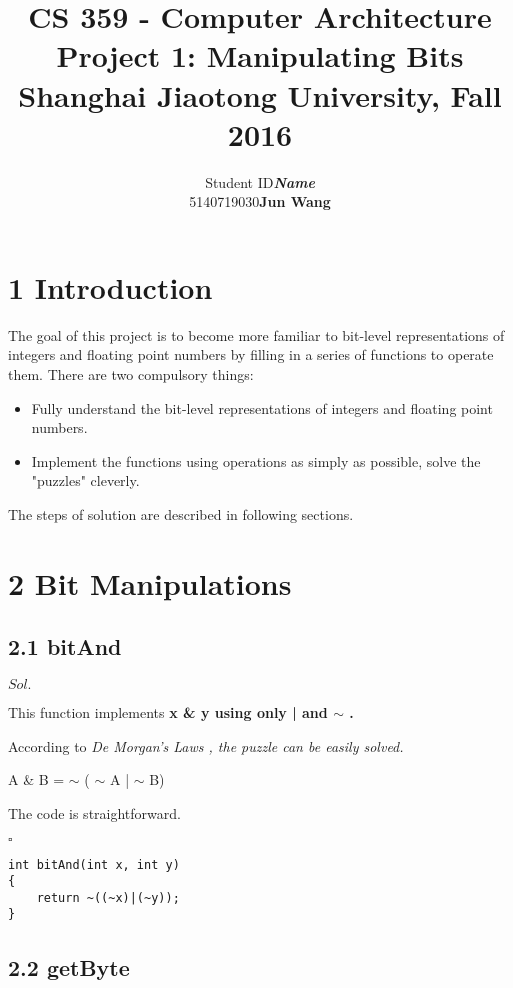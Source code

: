 \documentclass[a4paper, 11pt]{article}
\title{CS 359 - Computer Architecture \\ Project 1: Manipulating Bits \\ \vspace{3mm} {\large Shanghai Jiaotong University, Fall 2016}}
\author{
	\begin{tabular}{rl}
		Student ID & \textbf{\emph{Name}} \\ \hline
		5140719030 & \textbf{Jun Wang}
	\end{tabular}
}
\date{}
\newenvironment{sol}[1] {\par \noindent $#1.$} {\par \hfill $\square$}
\begin{document}
\maketitle

\section*{1 Introduction}

The goal of this project is to become more familiar to bit-level representations of integers and floating point numbers by filling in a series of functions to operate them. There are two compulsory things:
\begin{itemize}
	\item Fully understand the bit-level representations of integers and floating point numbers.
	\item Implement the functions using operations as simply as possible, solve the "puzzles" cleverly.
\end{itemize}
The steps of solution are described in following sections.

\section*{2 Bit Manipulations}

\subsection*{2.1 bitAnd}

\begin{sol}{Sol}

This function implements \bfseries x \& y \mdseries using only \bfseries {\big|} \mdseries and \bfseries $\sim$ \mdseries.

According to \itshape De Morgan's Laws \normalfont, the puzzle can be easily solved.

\centerline{A \& B = $\sim$ ( $\sim$ A {\big|} $\sim$ B)}

The code is straightforward.
\end{sol}
\begin{lstlisting}
int bitAnd(int x, int y)
{
    return ~((~x)|(~y));
}
\end{lstlisting}

\subsection*{2.2 getByte}
\end{document}
